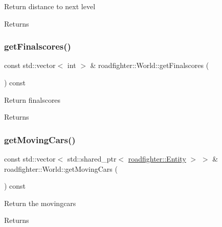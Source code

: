 Return distance to next level \begin{DoxyReturn}{Returns}

\end{DoxyReturn}
\mbox{\label{classroadfighter_1_1World_a64feef41674e319b5a39e984eb9ddc4c}} 
\subsubsection{\texorpdfstring{get\+Finalscores()}{getFinalscores()}}
{\footnotesize\ttfamily const std\+::vector$<$ int $>$ \& roadfighter\+::\+World\+::get\+Finalscores (\begin{DoxyParamCaption}{ }\end{DoxyParamCaption}) const}

Return finalscores \begin{DoxyReturn}{Returns}

\end{DoxyReturn}
\mbox{\label{classroadfighter_1_1World_adc2a97d01fcad3d6a4857d886e8a10e4}} 
\subsubsection{\texorpdfstring{get\+Moving\+Cars()}{getMovingCars()}}
{\footnotesize\ttfamily const std\+::vector$<$ std\+::shared\+\_\+ptr$<$ \hyperlink{classroadfighter_1_1Entity}{roadfighter\+::\+Entity} $>$ $>$ \& roadfighter\+::\+World\+::get\+Moving\+Cars (\begin{DoxyParamCaption}{ }\end{DoxyParamCaption}) const}

Return the movingcars \begin{DoxyReturn}{Returns}

\end{DoxyReturn}
\mbox{\label{classroadfighter_1_1World_a8825a89883229773abb09bb05ee89714}} 
